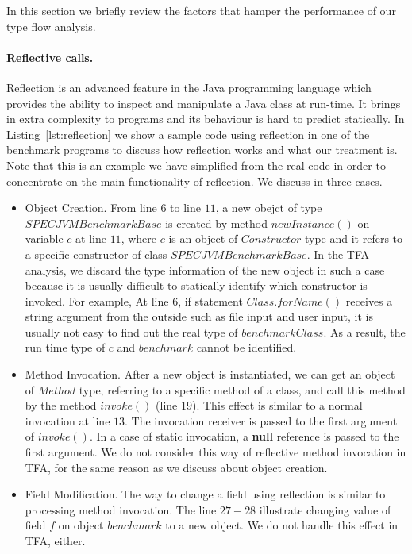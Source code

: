 \documentclass{fac}
\begin{document}
In this section we briefly review the factors that hamper the performance of our type flow analysis.

\paragraph{Reflective calls.} Reflection is an advanced feature in the Java programming language which provides the ability to inspect and manipulate a Java class at run-time. It brings in extra complexity to programs and its behaviour is hard to predict statically. In Listing~\ref{lst:reflection} we show a sample code using reflection in one of the benchmark programs to discuss how reflection works and what our treatment is. Note that this is an example we have simplified from the real code in order to concentrate on the main functionality of reflection. We discuss in three cases.
\begin{itemize}
\item Object Creation.
From line $6$ to line $11$, a new obejct of type $SPECJVMBenchmarkBase$ is created by method $newInstance()$ on variable $c$ at line $11$, where $c$ is an object of $Constructor$ type and it refers to a specific constructor of class $SPECJVMBenchmarkBase$. In the TFA analysis, we discard the type information of the new object in such a case because it is usually difficult to statically identify which constructor is invoked. For example, At line $6$, if statement $Class.forName()$ receives a string argument from the outside such as file input and user input, it is usually not easy to find out the real type of $benchmarkClass$. As a result, the run time type of $c$ and $benchmark$ cannot be identified.
\item Method Invocation.
After a new object is instantiated, we can get an object of $Method$ type, referring to a specific method of a class, and call this method by the method $invoke()$ (line $19$). This effect is similar to a normal invocation at line $13$. The invocation receiver is passed to the first argument of $invoke()$. In a case of static invocation, a \textbf{null} reference is passed to the first argument. We do not consider this way of reflective method invocation in TFA, for the same reason as we discuss about object creation.
\item Field Modification.
The way to change a field using reflection is similar to processing method invocation. The line $27-28$ illustrate changing value of field $f$ on object $benchmark$ to a new object. %
We do not handle this effect in TFA, either.
\end{itemize}
\end{document}
